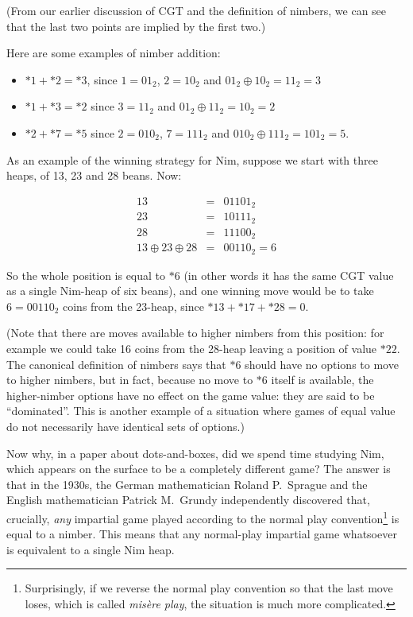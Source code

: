 \documentclass[a4paper,twocolumn]{article}
\begin{document}
(From our earlier discussion of CGT and the definition of nimbers, we
can see that the last two points are implied by the first two.)

Here are some examples of nimber addition:

\begin{itemize}
  \item $*1 + *2 = *3$, since $1 = 01_2$, $2 = 10_2$ and $01_2 \oplus
    10_2 = 11_2 = 3$
  \item $*1 + *3 = *2$ since $3 = 11_2$ and $01_2 \oplus 11_2 = 10_2 =
    2$
  \item $*2 + *7 = *5$ since $2 = 010_2$, $7 = 111_2$ and $010_2
    \oplus 111_2 = 101_2 = 5$.
\end{itemize}

As an example of the winning strategy for Nim, suppose we start with
three heaps, of 13, 23 and 28 beans. Now:

\begin{eqnarray*}
  13 & = & 01101_2 \\
  23 & = & 10111_2 \\
  28 & = & 11100_2 \\
  13 \oplus 23 \oplus 28 & = & 00110_2 = 6
\end{eqnarray*}

So the whole position is equal to $*6$ (in other words it has the same
CGT value as a single Nim-heap of six beans), and one winning move
would be to take $6 = 00110_2$ coins from the 23-heap, since $*13 +
*17 + *28 = 0$.

(Note that there are moves available to higher nimbers from this
position: for example we could take 16 coins from the 28-heap leaving
a position of value $*22$. The canonical definition of nimbers says
that $*6$ should have no options to move to higher nimbers, but in
fact, because no move to $*6$ itself is available, the higher-nimber
options have no effect on the game value: they are said to be
``dominated''. This is another example of a situation where games of
equal value do not necessarily have identical sets of options.)

Now why, in a paper about dots-and-boxes, did we spend time studying
Nim, which appears on the surface to be a completely different game?
The answer is that in the 1930s, the German mathematician Roland
P.\ Sprague and the English mathematician Patrick M.\ Grundy
independently discovered that, crucially, \emph{any} impartial game
played according to the normal play convention\footnote{Surprisingly,
  if we reverse the normal play convention so that the last move
  loses, which is called \emph{mis\`ere play}, the situation is much
  more complicated.} is equal to a nimber. This means that any
normal-play impartial game whatsoever is equivalent to a single Nim
heap.
\end{document}
